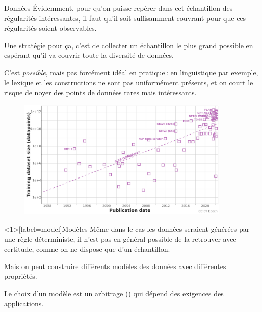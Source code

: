 \documentclass[
	xcolor={svgnames},
	aspectratio=169,
	french,
]{beamer}
\begin{document}
\begin{frame}{Données}
	Évidemment, pour qu'on puisse repérer dans cet échantillon des \alert{régularités} intéressantes, il faut qu'il soit suffisamment couvrant pour que ces régularités soient \alert{observables}.

	\pause

	Une stratégie pour ça, c'est de collecter un échantillon \alert{le plus grand possible} en espérant qu'il va couvrir toute la diversité de données.

	\pause

	C'est \emph{possible}, mais pas forcément idéal en pratique : en linguistique par exemple, le lexique et les constructions ne sont pas uniformément présents, et on court le risque de noyer des points de données \alert{rares mais intéressants}.
\end{frame}

\begin{frame}[plain]
	\begin{figure}
		\includegraphics[width=0.9\textwidth]{pics/trends-in-training-dataset-sizes.png}
	\end{figure}
	\parencite{villalobos2022TrendsTrainingDataset}
\end{frame}

\begin{frame}<1>[label=model]{Modèles}
	Même dans le cas les données seraient générées par une règle déterministe, il n'est pas en général possible de la retrouver avec certitude, comme on ne dispose que d'un \alert{échantillon}.

	\pause

	Mais on peut construire différents \alert{modèles} des données avec différentes propriétés.

	\pause

	Le choix d'un modèle est un arbitrage () qui dépend des exigences des \alert{applications}.
\end{frame}
\end{document}
